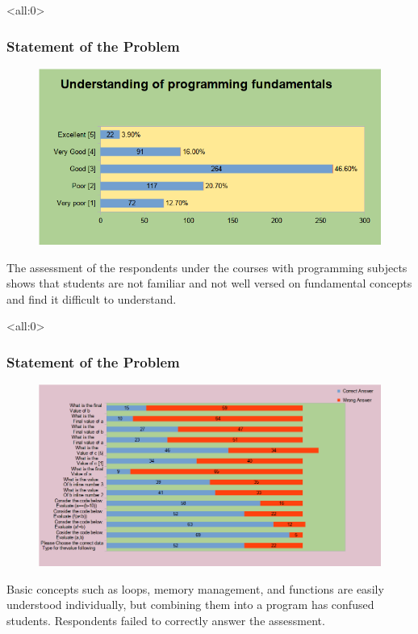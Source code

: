 \documentclass[handout]{beamer}
\newcommand{\parx}{
	\setlength{\parindent}{4em}
	\par}
\begin{document}
\begin{frame}<all:0>
	\frametitle{Statement of the Problem}
	\begin{figure}
		\includegraphics[scale=0.25]{results/12.png}
	\end{figure}

	\justifying
	\parx
	The assessment of the respondents under the courses with programming subjects
	shows that students are not familiar and not well versed on fundamental
	concepts and find it difficult to understand.
\end{frame}

\begin{frame}<all:0>
	\frametitle{Statement of the Problem}
	\begin{figure}
		\includegraphics[scale=0.25]{results/13.png}
	\end{figure}

	\justifying
	\parx
	Basic concepts such as loops, memory management, and functions are easily
	understood individually, but combining them into a program has confused
	students. Respondents failed to correctly answer the assessment.
\end{frame}
\end{document}
